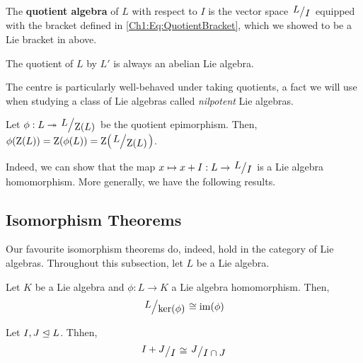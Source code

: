 \begin{boxdefinition}
    The \textbf{quotient algebra} of $L$ with respect to $I$ is the vector space $\quotient{L}{I}$ equipped with the bracket defined in \eqref{Ch1:Eq:QuotientBracket}, which we showed to be a Lie bracket in  above.
\end{boxdefinition}

\begin{boxexample}
    The quotient of $L$ by $L'$ is always an abelian Lie algebra.
\end{boxexample}


The centre is particularly well-behaved under taking quotients, a fact we will use when studying a class of Lie algebras called \textit{nilpotent} Lie algebras.

\begin{boxproposition}
    Let $\phi : L \surj \quotient{L}{\Zof{L}}$ be the quotient epimorphism. Then, $\phiof{\Zof{L}} = \Zof{\phiof{L}} = \Zof{\quotient{L}{\Zof{L}}}$.
\end{boxproposition}

Indeed, we can show that the map $x \mapsto x + I : L \to \quotient{L}{I}$ is a Lie algebra homomorphism. More generally, we have the following results. %

\subsection{Isomorphism Theorems}

Our favourite isomorphism theorems do, indeed, hold in the category of Lie algebras. Throughout this subsection, let $L$ be a Lie algebra.

\begin{boxtheorem}\label{SP:Thm:FirstIso}
    Let $K$ be a Lie algebra and $\phi : L \to K$ a Lie algebra homomorphism. Then,
    \begin{align}
        \quotient{L}{\pker{\phi}} \cong \pim{\phi}
        \label{SP:Eq:FirstIsomorphism}
    \end{align}
\end{boxtheorem}

\begin{boxtheorem}\label{SP:Thm:SecondIso}
    Let $I, J \trianglelefteq L$. Thhen,
    \begin{align}
        \quotient{I + J}{I} \cong \quotient{J}{I \cap J}
        \label{SP:Eq:SecondIsomorphism}
    \end{align}
\end{boxtheorem}


